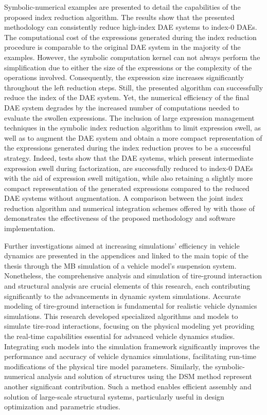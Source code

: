 Symbolic-numerical examples are presented to detail the capabilities of the proposed index reduction algorithm. The results show that the presented methodology can consistently reduce high-index \ac{DAE} systems to index-0 \acp{DAE}. The computational cost of the expressions generated during the index reduction procedure is comparable to the original \ac{DAE} system in the majority of the examples. However, the \Maple{} symbolic computation kernel can not always perform the simplification due to either the size of the expressions or the complexity of the operations involved. Consequently, the expression size increases significantly throughout the left reduction steps. Still, the presented algorithm can successfully reduce the index of the \ac{DAE} system. Yet, the numerical efficiency of the final \ac{DAE} system degrades by the increased number of computations needed to evaluate the swollen expressions. The inclusion of large expression management techniques in the symbolic index reduction algorithm to limit expression swell, as well as to augment the \ac{DAE} system and obtain a more compact representation of the expressions generated during the index reduction proves to be a successful strategy. Indeed, tests show that the \ac{DAE} systems, which present intermediate expression swell during factorization, are successfully reduced to index-0 \acp{DAE} with the aid of expression swell mitigation, while also retaining a slightly more compact representation of the generated expressions compared to the reduced \ac{DAE} systems without augmentation. A comparison between the joint index reduction algorithm and numerical integration schemes offered by \Maple{} with those of \Indigo{} demonstrates the effectiveness of the proposed methodology and software implementation.

Further investigations aimed at increasing simulations' efficiency in vehicle dynamics are presented in the appendices and linked to the main topic of the thesis through the \ac{MB} simulation of a vehicle model's suspension system. Nonetheless, the comprehensive analysis and simulation of tire-ground interaction and structural analysis are crucial elements of this research, each contributing significantly to the advancements in dynamic system simulations. Accurate modeling of tire-ground interaction is fundamental for realistic vehicle dynamics simulations. This research developed specialized algorithms and models to simulate tire-road interactions, focusing on the physical modeling yet providing the real-time capabilities essential for advanced vehicle dynamics studies. Integrating such models into the simulation framework significantly improves the performance and accuracy of vehicle dynamics simulations, facilitating run-time modifications of the physical tire model parameters. Similarly, the symbolic-numerical analysis and solution of structures using the \ac{DSM} method represent another significant contribution. Such a method enables efficient assembly and solution of large-scale structural systems, particularly useful in design optimization and parametric studies.

